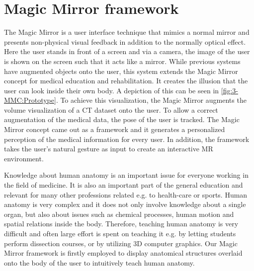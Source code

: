 \section{Magic Mirror framework} \label{sec:3-PPMM:MMC}
The Magic Mirror \cite{Grosjean1999} is a user interface technique that mimics a normal mirror and presents non-physical visual feedback in addition to the normally optical effect. Here the user stands in front of a screen and via a camera, the image of the user is shown on the screen such that it acts like a mirror. 
While previous systems have augmented objects onto the user, this system extends the Magic Mirror concept for medical education and rehabilitation. It creates the illusion that the user can look inside their own body. A depiction of this can be seen in \figurename{\ref{fig:3-MMC:Prototype}}. To achieve this visualization, the Magic Mirror augments the volume visualization of a CT dataset onto the user. 
To allow a correct augmentation of the medical data, the pose of the user is tracked. The Magic Mirror concept came out as a framework and it generates a personalized perception of the medical information for every user. In addition, the framework takes the user's natural gesture as input to create an interactive MR environment. 

Knowledge about human anatomy is an important issue for everyone working in the field of medicine. 
It is also an important part of the general education and relevant for many other professions related e.g. to health-care or sports. Human anatomy is very complex and it does not only involve knowledge about a single organ, but also about issues such as chemical processes, human motion and spatial relations inside the body. Therefore, teaching human anatomy is very difficult and often large effort is spent on teaching it e.g. by letting students perform dissection courses, or by utilizing 3D computer graphics.
Our Magic Mirror framework is firstly employed to display anatomical structures overlaid onto the body of the user to intuitively teach human anatomy. 

